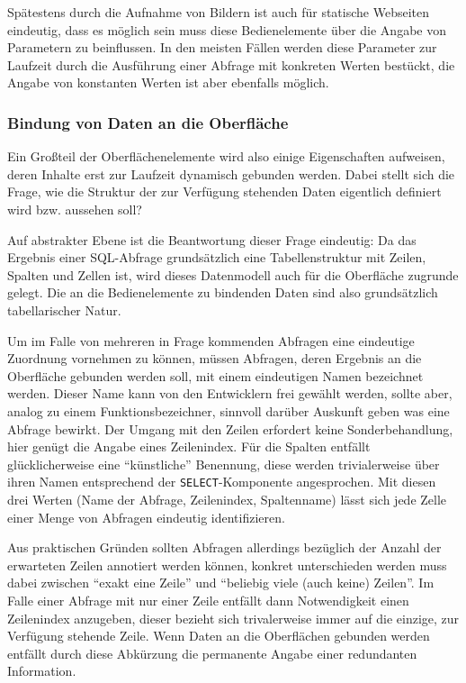 Spätestens durch die Aufnahme von Bildern ist auch für statische Webseiten eindeutig, dass es möglich sein muss diese Bedienelemente über die Angabe von Parametern zu beinflussen. In den meisten Fällen werden diese Parameter zur Laufzeit durch die Ausführung einer Abfrage mit konkreten Werten bestückt, die Angabe von konstanten Werten ist aber ebenfalls möglich.

\subsubsection{Bindung von Daten an die Oberfläche}
\label{sec:design-ui-bind-output}

Ein Großteil der Oberflächenelemente wird also einige Eigenschaften aufweisen, deren Inhalte erst zur Laufzeit dynamisch gebunden werden. Dabei stellt sich die Frage, wie die Struktur der zur Verfügung stehenden Daten eigentlich definiert wird bzw. aussehen soll?

Auf abstrakter Ebene ist die Beantwortung dieser Frage eindeutig: Da das Ergebnis einer SQL-Abfrage grundsätzlich eine Tabellenstruktur mit Zeilen, Spalten und Zellen ist, wird dieses Datenmodell auch für die Oberfläche zugrunde gelegt. Die an die Bedienelemente zu bindenden Daten sind also grundsätzlich tabellarischer Natur.

Um im Falle von mehreren in Frage kommenden Abfragen eine eindeutige Zuordnung vornehmen zu können, müssen Abfragen, deren Ergebnis an die Oberfläche gebunden werden soll, mit einem eindeutigen Namen bezeichnet werden. Dieser Name kann von den Entwicklern frei gewählt werden, sollte aber, analog zu einem Funktionsbezeichner, sinnvoll darüber Auskunft geben was eine Abfrage bewirkt. Der Umgang mit den Zeilen erfordert keine Sonderbehandlung, hier genügt die Angabe eines Zeilenindex. Für die Spalten entfällt glücklicherweise eine ``künstliche'' Benennung, diese werden trivialerweise über ihren Namen entsprechend der \texttt{SELECT}-Komponente angesprochen. Mit diesen drei Werten (Name der Abfrage, Zeilenindex, Spaltenname) lässt sich jede Zelle einer Menge von Abfragen eindeutig identifizieren.

Aus praktischen Gründen sollten Abfragen allerdings bezüglich der Anzahl der erwarteten Zeilen annotiert werden können, konkret unterschieden werden muss dabei zwischen ``exakt eine Zeile'' und ``beliebig viele (auch keine) Zeilen''. Im Falle einer Abfrage mit nur einer Zeile entfällt dann Notwendigkeit einen Zeilenindex anzugeben, dieser bezieht sich trivalerweise immer auf die einzige, zur Verfügung stehende Zeile. Wenn Daten an die Oberflächen gebunden werden entfällt durch diese Abkürzung die permanente Angabe einer redundanten Information.

